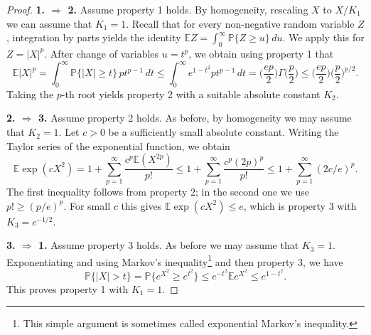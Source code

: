 \documentclass[10pt, openany]{book}
\theoremstyle{remark}
\def \E {\mathbb{E}}
\def \P {\mathbb{P}}
\begin{document}
\begin{proof}
{\bf 1. $\Rightarrow$ 2.}
Assume property 1 holds. 
By homogeneity, rescaling $X$ to $X/K_1$ we can assume that $K_1=1$. 
Recall that for every non-negative random variable $Z$, integration by parts 
yields the identity 
$\E Z = \int_0^\infty \P \{ Z \ge u \} \, du$.
We apply this for $Z = |X|^p$. 
After change of variables $u = t^p$, we obtain using property 1 that
$$
\E |X|^p 
= \int_0^\infty \P \{ |X| \ge t \} \, p t^{p-1} \, dt
\le \int_0^\infty e^{1-t^2} p t^{p-1} \, dt
= \big( \frac{ep}{2} \big) \Gamma \big( \frac{p}{2} \big) 
\le \big( \frac{ep}{2} \big) \big( \frac{p}{2} \big)^{p/2}.
$$
Taking the $p$-th root yields property 2 with a suitable absolute constant $K_2$.

{\bf 2. $\Rightarrow$ 3.}
Assume property 2 holds. 
As before, by homogeneity we may assume that $K_2 = 1$. Let $c>0$ be a sufficiently small absolute constant. 
Writing the Taylor series of the exponential function, we obtain
$$
\E \exp(c X^2) 
= 1 + \sum_{p=1}^\infty \frac{c^p \E(X^{2p})}{p!}
\le 1 + \sum_{p=1}^\infty \frac{c^p (2p)^p}{p!}	
\le 1 + \sum_{p=1}^\infty (2c/e)^p.
$$
The first inequality follows from property 2; in the second one we use $p! \ge (p/e)^p$.
For small $c$ this gives $\E \exp(c X^2) \le e$, which 
is property 3 with $K_3 = c^{-1/2}$.

{\bf 3. $\Rightarrow$ 1.}
Assume property 3 holds. As before we may assume that $K_3=1$. 
Exponentiating and using Markov's inequality\footnote{This simple argument is sometimes called 
exponential Markov's inequality.}
and then property 3, we have
$$
\P \{ |X| > t \} 
= \P \{ e^{X^2} \ge e^{t^2} \} 
\le e^{-t^2} \E e^{X^2}
\le e^{1-t^2}.
$$
This proves property 1 with $K_1=1$.


\end{proof}
\end{document}

